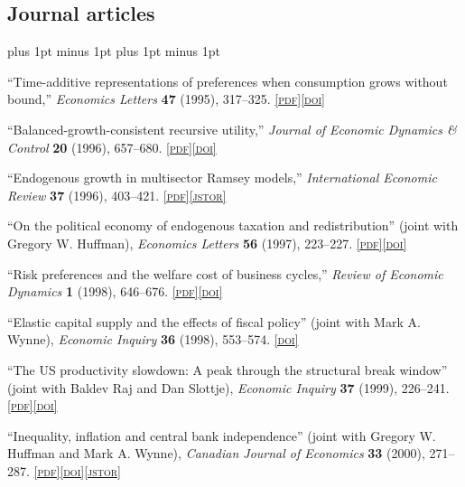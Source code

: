 \documentclass[letterpaper]{article}
\renewenvironment{itemize}{
  \begin{list}{}{
    \setlength{\leftmargin}{1.5em}
    \itemsep -1pt plus 1pt minus 1pt
    \topsep -1pt plus 1pt minus 1pt
  }
}{
  \end{list}
}
\newcommand{\jstor}[1]{\href{#1}{\scriptsize\textsc{[jstor]}}}
\newcommand{\pdf}[1]{\href{#1}{\scriptsize\textsc{[pdf]}}}
\newcommand{\doi}[1]{\href{http://dx.doi.org/#1}{\scriptsize\textsc{[doi]}}}
\begin{document}
\subsection*{Journal articles}
\begin{itemize}
\item ``Time-additive representations of preferences when consumption grows without bound,'' \textit{Economics Letters} \textbf{47} (1995), 317--325. \pdf{https://jimdolmas.github.io/assets/tas.pdf}\doi{10.1016/0165-1765(94)00566-K}

\item ``Balanced-growth-consistent recursive utility,'' \textit{Journal of Economic Dynamics \& Control} \textbf{20} (1996), 657--680. \pdf{https://jimdolmas.github.io/assets/bgcru.pdf}\doi{10.1016/0165-1889(95)00869-1}

\item ``Endogenous growth in multisector Ramsey models,'' \textit{International Economic Review} \textbf{37} (1996), 403--421. \pdf{https://jimdolmas.github.io/assets/ramsey.pdf}\jstor{http://www.jstor.org/stable/2527330}

\item ``On the political economy of endogenous taxation and redistribution'' (joint with Gregory W. Huffman), \textit{Economics Letters} \textbf{56} (1997), 223--227. \pdf{https://jimdolmas.github.io/assets/redistribution.pdf}\doi{10.1016/S0165-1765(97)81904-0}

\item ``Risk preferences and the welfare cost of business cycles,'' \textit{Review of Economic Dynamics} \textbf{1} (1998), 646--676. \pdf{https://jimdolmas.github.io/assets/cost_of_business_cycles_RED_98.pdf}\doi{10.1006/redy.1998.0020}

\item ``Elastic capital supply and the effects of fiscal policy'' (joint with Mark A. Wynne), \textit{Economic Inquiry} \textbf{36} (1998), 553--574. \doi{10.1111/j.1465-7295.1998.tb01736.x}

\item ``The US productivity slowdown: A peak through the structural break window'' (joint with Baldev Raj and Dan Slottje), \textit{Economic Inquiry} \textbf{37} (1999), 226--241. \pdf{https://jimdolmas.github.io/assets/structural_breaks.pdf}\doi{10.1111/j.1465-7295.1999.tb01427.x}

\item ``Inequality, inflation and central bank independence'' (joint with Gregory W. Huffman and Mark A. Wynne), \textit{Canadian Journal of Economics} \textbf{33} (2000), 271--287. \pdf{https://jimdolmas.github.io/assets/dhw.pdf}\doi{10.1111/0008-4085.00015}\jstor{http://www.jstor.org/stable/2667378}


\end{itemize}
\end{document}
